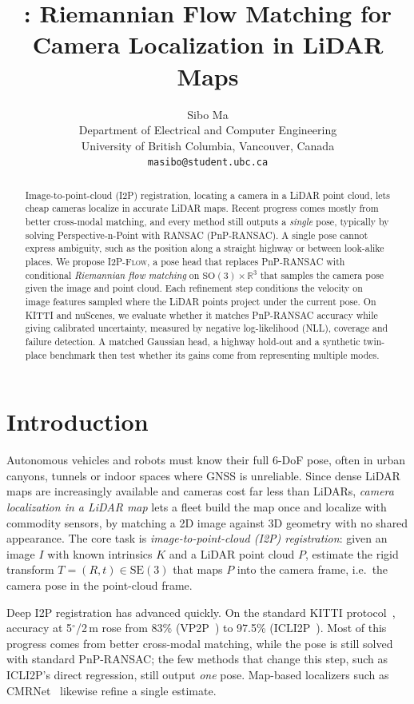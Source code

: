 \documentclass{article}
\title{\method: Riemannian Flow Matching for\\Camera Localization in LiDAR Maps}
\author{%
  Sibo Ma\\
  Department of Electrical and Computer Engineering\\
  University of British Columbia, Vancouver, Canada\\
  \texttt{masibo@student.ubc.ca}
}
\newcommand{\R}{\mathbb{R}}
\newcommand{\SO}{\mathrm{SO}(3)}
\newcommand{\SE}{\mathrm{SE}(3)}
\newcommand{\method}{\textsc{I2P-Flow}}
\begin{document}
\maketitle

\begin{abstract}
Image-to-point-cloud (I2P) registration, locating a camera in a LiDAR point cloud, lets cheap cameras localize in accurate LiDAR maps.
Recent progress comes mostly from better cross-modal matching, and every method still outputs a \emph{single} pose, typically by solving Perspective-n-Point with RANSAC (PnP-RANSAC). A single pose cannot express ambiguity, such as the position along a straight highway or between look-alike places.
We propose \method{}, a pose head that replaces PnP-RANSAC with conditional \emph{Riemannian flow matching} on $\SO\times\R^3$ that samples the camera pose given the image and point cloud. Each refinement step conditions the velocity on image features sampled where the LiDAR points project under the current pose.
On KITTI and nuScenes, we evaluate whether it matches PnP-RANSAC accuracy while giving calibrated uncertainty, measured by negative log-likelihood (NLL), coverage and failure detection.
A matched Gaussian head, a highway hold-out and a synthetic twin-place benchmark then test whether its gains come from representing multiple modes.
\end{abstract}

\section{Introduction}
\label{sec:intro}

Autonomous vehicles and robots must know their full 6-DoF pose, often in urban canyons, tunnels or indoor spaces where GNSS is unreliable. Since dense LiDAR maps are increasingly available and cameras cost far less than LiDARs, \emph{camera localization in a LiDAR map} lets a fleet build the map once and localize with commodity sensors, by matching a 2D image against 3D geometry with no shared appearance. The core task is \emph{image-to-point-cloud (I2P) registration}: given an image $I$ with known intrinsics $K$ and a LiDAR point cloud $P$, estimate the rigid transform $T=(R,t)\in\SE$ that maps $P$ into the camera frame, i.e.\ the camera pose in the point-cloud frame.

Deep I2P registration has advanced quickly. On the standard KITTI protocol~\cite{geiger2012kitti}, accuracy at 5$^\circ$/2\,m rose from 83\% (VP2P~\cite{zhou2023vp2p}) to 97.5\% (ICLI2P~\cite{li2025icli2p}). Most of this progress comes from better cross-modal matching, while the pose is still solved with standard PnP-RANSAC; the few methods that change this step, such as ICLI2P's direct regression, still output \emph{one} pose. Map-based localizers such as CMRNet~\cite{cattaneo2019cmrnet,cattaneo2025cmrnext} likewise refine a single estimate.
\end{document}
